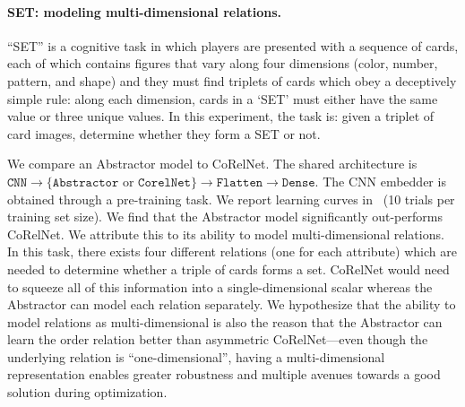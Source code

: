 \paragraph{SET: modeling multi-dimensional relations.}
``SET'' is a cognitive task in which 
players are presented with a sequence of cards, each of which contains figures that vary along four dimensions (color, number, pattern, and shape) and they must find triplets of cards which obey a deceptively simple rule: along each dimension, cards in a `SET' must either have the same value or three unique values. %
In this experiment, the task is: given a triplet of card images, determine whether they form a SET or not.

We compare an Abstractor model to CoRelNet. The shared architecture is $\texttt{CNN} \to \{\texttt{Abstractor} \text{ or } \texttt{CorelNet}\} \to \texttt{Flatten} \to \texttt{Dense}$. The CNN embedder is obtained through a pre-training task. We report learning curves in~ (10 trials per training set size). We find that the Abstractor model significantly out-performs CoRelNet. We attribute this to its ability to model multi-dimensional relations. In this task, there exists four different relations (one for each attribute) which are needed to determine whether a triple of cards forms a set. CoRelNet would need to squeeze all of this information into a single-dimensional scalar whereas the Abstractor can model each relation separately. We hypothesize that the ability to model relations as multi-dimensional is also the reason that the Abstractor can learn the order relation better than asymmetric CoRelNet---even though the underlying relation is ``one-dimensional'', having a multi-dimensional representation enables greater robustness and multiple avenues towards a good solution during optimization.

